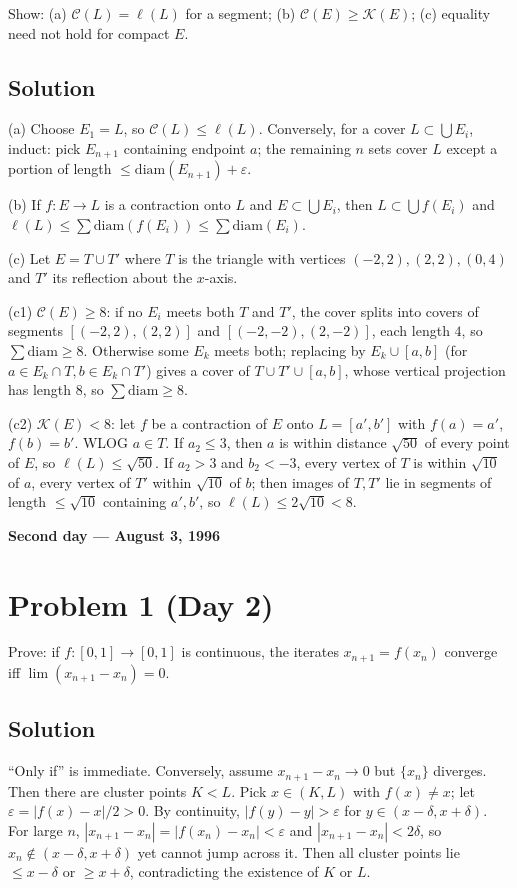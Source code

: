 \documentclass{article}
\begin{document}
Show: (a) $\mathcal{C}(L) = \ell(L)$ for a segment; (b) $\mathcal{C}(E) \geq \mathcal{K}(E)$; (c) equality need not hold for compact $E$.

\subsection*{Solution}
(a) Choose $E_1 = L$, so $\mathcal{C}(L) \leq \ell(L)$. Conversely, for a cover $L \subset \bigcup E_i$, induct: pick $E_{n+1}$ containing endpoint $a$; the remaining $n$ sets cover $L$ except a portion of length $\leq \mathrm{diam}(E_{n+1}) + \varepsilon$.

(b) If $f: E \to L$ is a contraction onto $L$ and $E \subset \bigcup E_i$, then $L \subset \bigcup f(E_i)$ and $\ell(L) \leq \sum \mathrm{diam}(f(E_i)) \leq \sum \mathrm{diam}(E_i)$.

(c) Let $E = T \cup T'$ where $T$ is the triangle with vertices $(-2,2), (2,2), (0,4)$ and $T'$ its reflection about the $x$-axis.

(c1) $\mathcal{C}(E) \geq 8$: if no $E_i$ meets both $T$ and $T'$, the cover splits into covers of segments $[(-2,2),(2,2)]$ and $[(-2,-2),(2,-2)]$, each length $4$, so $\sum \mathrm{diam} \geq 8$. Otherwise some $E_k$ meets both; replacing by $E_k \cup [a,b]$ (for $a\in E_k\cap T, b\in E_k\cap T'$) gives a cover of $T\cup T'\cup[a,b]$, whose vertical projection has length $8$, so $\sum\mathrm{diam}\geq 8$.

(c2) $\mathcal{K}(E) < 8$: let $f$ be a contraction of $E$ onto $L=[a',b']$ with $f(a)=a'$, $f(b)=b'$. WLOG $a \in T$. If $a_2 \leq 3$, then $a$ is within distance $\sqrt{50}$ of every point of $E$, so $\ell(L) \leq \sqrt{50}$. If $a_2 > 3$ and $b_2 < -3$, every vertex of $T$ is within $\sqrt{10}$ of $a$, every vertex of $T'$ within $\sqrt{10}$ of $b$; then images of $T, T'$ lie in segments of length $\leq \sqrt{10}$ containing $a', b'$, so $\ell(L) \leq 2\sqrt{10} < 8$.

\begin{center}\textbf{Second day --- August 3, 1996}\end{center}

\section*{Problem 1 (Day 2)}
Prove: if $f:[0,1]\to[0,1]$ is continuous, the iterates $x_{n+1} = f(x_n)$ converge iff $\lim (x_{n+1} - x_n) = 0$.

\subsection*{Solution}
``Only if'' is immediate. Conversely, assume $x_{n+1}-x_n \to 0$ but $\{x_n\}$ diverges. Then there are cluster points $K < L$. Pick $x \in (K, L)$ with $f(x) \neq x$; let $\varepsilon = |f(x)-x|/2 > 0$. By continuity, $|f(y) - y| > \varepsilon$ for $y \in (x-\delta, x+\delta)$. For large $n$, $|x_{n+1}-x_n| = |f(x_n)-x_n| < \varepsilon$ and $|x_{n+1}-x_n| < 2\delta$, so $x_n \notin (x-\delta, x+\delta)$ yet cannot jump across it. Then all cluster points lie $\leq x - \delta$ or $\geq x + \delta$, contradicting the existence of $K$ or $L$.
\end{document}
